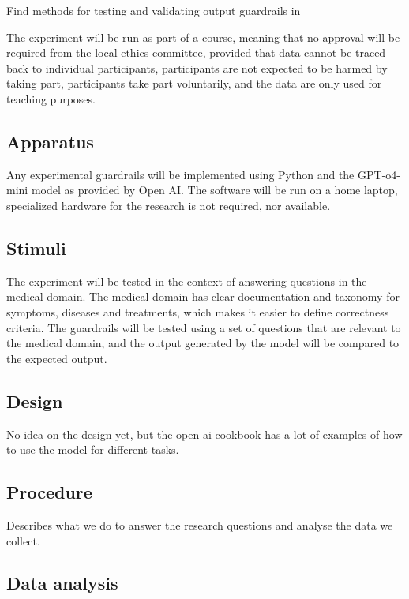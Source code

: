 \documentclass[a4paper,doc,natbib]{apa6}
\begin{document}
    Find methods for testing and validating output guardrails in \cite{zhu2024testing}

    The experiment will be run as part of a course, meaning that no approval will be required from the local ethics committee, provided that data cannot be traced back to individual participants, participants are not expected to be harmed by taking part, participants take part voluntarily, and the data are only used for teaching purposes.

    \subsection{Apparatus}

    Any experimental guardrails will be implemented using Python and the GPT-o4-mini model as provided by Open AI.
    The software will be run on a home laptop, specialized hardware for the research is not required, nor available.

    \subsection{Stimuli}

    The experiment will be tested in the context of answering questions in the medical domain.
    The medical domain has clear documentation and taxonomy for symptoms, diseases and treatments, which makes it easier to define correctness criteria.
    The guardrails will be tested using a set of questions that are relevant to the medical domain, and the output generated by the model will be compared to the expected output.

    \subsection{Design}

    No idea on the design yet, but the open ai cookbook \cite{openai2023guardrails} has a lot of examples of how to use the model for different tasks.

    \subsection{Procedure}

    Describes what we do to answer the research questions and analyse the data we collect.

    \subsection{Data analysis}
\end{document}
